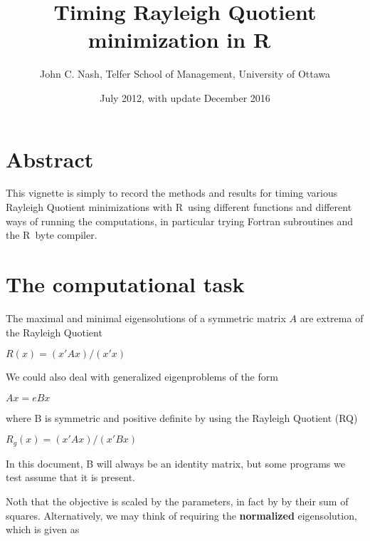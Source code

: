 \documentclass[10pt]{article}\usepackage[]{graphicx}\usepackage[]{color}
\makeatletter
\newenvironment{kframe}{%
 \def\at@end@of@kframe{}%
 \ifinner\ifhmode%
  \def\at@end@of@kframe{\end{minipage}}%
  \begin{minipage}{\columnwidth}%
 \fi\fi%
 \def\FrameCommand##1{\hskip\@totalleftmargin \hskip-\fboxsep
 \colorbox{shadecolor}{##1}\hskip-\fboxsep
     \hskip-\linewidth \hskip-\@totalleftmargin \hskip\columnwidth}%
 \MakeFramed {\advance\hsize-\width
   \@totalleftmargin\z@ \linewidth\hsize
   \@setminipage}}%
 {\par\unskip\endMakeFramed%
 \at@end@of@kframe}
\newenvironment{knitrout}{}{} %
\newcommand{\R}{{\sf R\ }}
\newcommand{\B}[1]{{\bf #1 \rm}}
\makeatother
\begin{document}
\begin{knitrout}
\color{fgcolor}\begin{kframe}


{\ttfamily\noindent\color{warningcolor}{\#\# Warning in parse\_objects(paths[1L]): file cache/\_\_objects not found}}

{\ttfamily\noindent\color{warningcolor}{\#\# Warning in parse\_objects(paths[2L]): file cache/\_\_globals not found}}\end{kframe}
\end{knitrout}

\title{Timing Rayleigh Quotient minimization in \R}
\author{John C. Nash, Telfer School of Management, University of Ottawa}
\date{July 2012, with update December 2016}
\maketitle

\section*{Abstract}

This vignette is simply to record the methods and results for timing 
various Rayleigh Quotient minimizations with \R using different functions
and different ways of running the computations, in particular trying Fortran
subroutines and the \R byte compiler.

\section{The computational task}

The maximal and minimal eigensolutions of a symmetric matrix $A$ are extrema of the Rayleigh Quotient

$ R(x) =  (x' A x)  / (x' x) $

We could also deal with generalized eigenproblems of the form 

$A x = e B x$

where B is symmetric and positive definite by using the Rayleigh Quotient (RQ)

$ R_g(x) =  (x' A x)  / (x' B x) $

In this document, B will always be an identity matrix, but some programs we test
assume that it is present.

Noth that the objective is scaled by the parameters, in fact by by their 
sum of squares. Alternatively, 
we may think of requiring the \B{normalized} eigensolution, which is given as 
\end{document}
